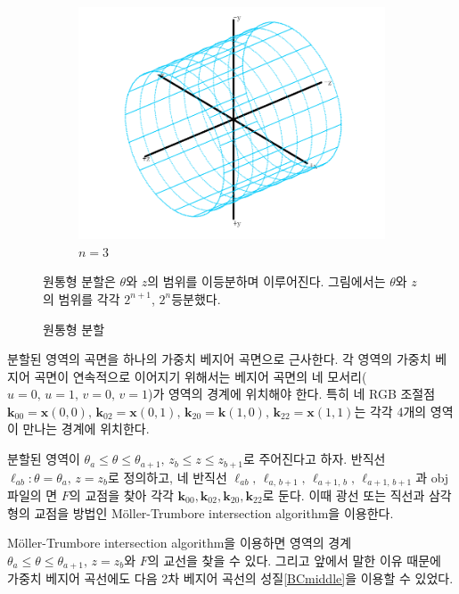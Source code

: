 \documentclass{gshs_thesis}
\theoremstyle{theorem}
\theoremstyle{lemma}
\theoremstyle{definition}
\begin{document}
\begin{figure}[h]
\begin{center}
		\begin{subfigure}{.3\textwidth}
			\includegraphics[width=\textwidth]{image/subdivision3}
			\caption{$n=3$}
		\end{subfigure}
	\end{center} 
    \caption{원통형 분할}
	\raggedright \small  원통형 분할은 $\theta$와 $z$의 범위를 이등분하며 이루어진다. 그림에서는 $\theta$와 $z$의 범위를 각각 $2^{n+1}$, $2^n$등분했다. 
\end{figure}

분할된 영역의 곡면을 하나의 가중치 베지어 곡면으로 근사한다. 각 영역의 가중치 베지어 곡면이 연속적으로 이어지기 위해서는 베지어 곡면의 네 모서리($u=0, \, u=1, \, v=0, \, v=1$)가 영역의 경계에 위치해야 한다. 특히 네 RGB 조절점 $\mathbf{k}_{00} = \mathbf{x}(0, 0), \, \mathbf{k}_{02} = \mathbf{x}(0, 1), \, \mathbf{k}_{20} = \mathbf{k}(1, 0), \, \mathbf{k}_{22} = \mathbf{x}(1, 1)$는 각각 4개의 영역이 만나는 경계에 위치한다. 

분할된 영역이 $\theta_a \leq \theta \leq \theta_{a+1}, \, z_b \leq z \leq z_{b+1}$로 주어진다고 하자. 반직선 $\ell_{ab} \colon \theta = \theta_a, \, z = z_b$로 정의하고, 네 반직선 $\ell_{ab}, \, \ell_{a, \, b+1}, \, \ell_{a+1, \, b}, \, \ell_{a+1, \, b+1}$과 obj파일의 면 $F$의 교점을 찾아 각각 $\mathbf{k}_{00}, \mathbf{k}_{02}, \mathbf{k}_{20}, \mathbf{k}_{22}$로 둔다. 이때 광선 또는 직선과 삼각형의 교점을 방법인 Möller-Trumbore intersection algorithm을 이용한다. \cite{raytriangle}

Möller-Trumbore intersection algorithm을 이용하면 영역의 경계 $\theta_a \leq \theta \leq \theta_{a+1}, \, z = z_b$와 $F$의 교선을 찾을 수 있다. 그리고 앞에서 말한 이유 때문에 가중치 베지어 곡선에도  다음 2차 베지어 곡선의 성질\eqref{BCmiddle}을 이용할 수 있었다.
\end{document}
